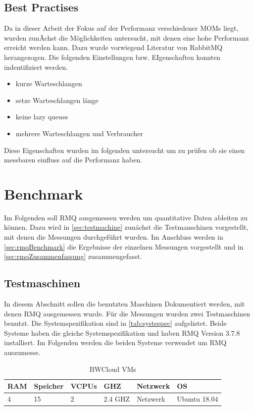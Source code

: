 \subsection{Best Practises}
Da in dieser Arbeit der Fokus auf der Performanz verschiedener MOMs liegt, wurden zunÄchst die Möglichkeiten untersucht, mit denen eine hohe Performanz erreicht werden kann. Dazu wurde vorwiegend Literatur von RabbitMQ herangezogen. Die folgenden Einstellungen bzw. EIgenschaften konnten indentifiziert werden.
\begin{itemize}
    \item kurze Warteschlangen
    \item setze Warteschlangen länge
    \item keine lazy queues
    \item mehrere Warteschlangen und Verbraucher
\end{itemize}
Diese Eigenschaften wurden im folgenden untersucht um zu prüfen ob sie einen messbaren einfluss auf die Performanz haben.

\section{Benchmark}
Im Folgenden soll RMQ ausgemessen werden um quantitative Daten ableiten zu können. Dazu wird in \autoref{sec:testmachine} zunächst die Testmanschinen vorgestellt, mit denen die Messungen durchgeführt wurden. Im Anschluss werden in \autoref{sec:rmqBenchmark} die Ergebnisse der einzelnen Messungen vorgestellt und in \autoref{sec:rmqZusammenfassung} zusammengefasst.

\subsection{Testmaschinen}
\label{sec:testmachine}
In diesem Abschnitt sollen die benutzten Maschinen Dokumentiert werden, mit denen RMQ ausgemessen wurde. Für die Messungen wurden zwei Testmaschinen benutzt. Die Systemspezifikation sind in \autoref{tab:systespec} aufgelistet. Beide Systeme haben die gleiche Systemspezifikation und haben RMQ Version 3.7.8 installiert. Im Folgenden werden die beiden Systeme verwendet um RMQ auszumesse.

\begin{table}
  \begin{tabular}{|l|l|l|l|l|l|}
    RAM & Speicher & VCPUs & GHZ & Netzwerk & OS \\
    \hline
     4 & 15 & 2 & 2.4 GHZ & Netzwerk & Ubuntu 18.04
  \end{tabular}
	\caption{\label{tab:systespec} BWCloud VMs}
\end{table}

